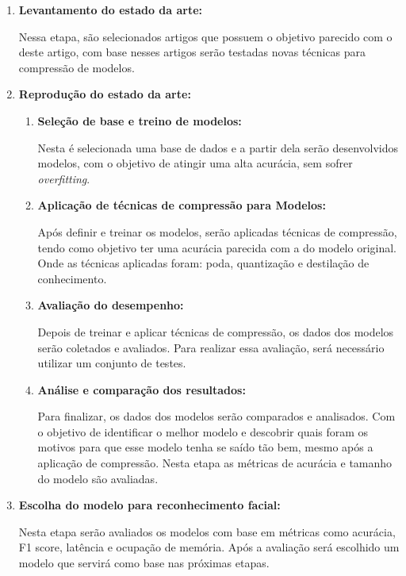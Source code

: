 \begin{enumerate}
	\item \textbf{Levantamento do estado da arte:}

		Nessa etapa, são selecionados artigos que possuem o objetivo parecido com o deste artigo,
		com base nesses artigos serão testadas novas técnicas para compressão de modelos.

	\item \textbf{Reprodução do estado da arte:}

	\begin{enumerate}
		\item \textbf{Seleção de base e treino de modelos:}

			Nesta é selecionada uma base de dados e a partir dela serão desenvolvidos modelos,
			com o objetivo de atingir uma alta acurácia, sem sofrer \textit{overfitting}.

		\item \textbf{Aplicação de técnicas de compressão para Modelos:}

			Após definir e treinar os modelos, serão aplicadas técnicas de compressão, tendo como
			objetivo ter uma acurácia parecida com a do modelo original. Onde as técnicas aplicadas
			foram: poda, quantização e destilação de conhecimento.

		\item \textbf{Avaliação do desempenho:}

			Depois de treinar e aplicar técnicas de compressão, os dados dos modelos serão coletados e
			avaliados. Para realizar essa avaliação, será necessário utilizar um conjunto de testes.

		\item \textbf{Análise e comparação dos resultados:}

			Para finalizar, os dados dos modelos serão comparados e analisados. Com o objetivo de
			identificar o melhor modelo e descobrir quais foram os motivos para que esse modelo tenha se
			saído tão bem, mesmo após a aplicação de compressão. Nesta etapa as métricas de acurácia e
			tamanho do modelo são avaliadas.
	\end{enumerate}

	\item \textbf{Escolha do modelo para reconhecimento facial:}

		Nesta etapa serão avaliados os modelos com base em métricas como acurácia, F1 score, latência e ocupação de
		memória. Após a avaliação será escolhido um modelo que servirá como base nas próximas etapas.


\end{enumerate}
